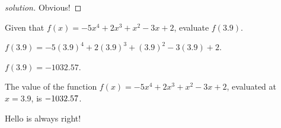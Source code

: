 \documentclass[nonumbers]{ximera}
\begin{document}


\begin{theorem}[Hello]
\end{theorem}

\begin{proof}[solution] Obvious!
\end{proof}


\begin{exercise}
Given that $f(x)=-5 x^4+2 x^3+x^2-3 x+2$, evaluate $f(3.9)$.
\begin{solution}
\begin{hint}
$f(3.9)=-5 (3.9)^4+2 (3.9)^3+(3.9)^2-3 (3.9)+2$.
\end{hint}
\begin{hint}
$f(3.9)=-1032.57$.
\end{hint}
The value of the function $f(x) = -5 x^4+2 x^3+x^2-3 x+2$, evaluated at $x=3.9$, is ${-1032.57}$.
\end{solution}
\end{exercise}


\begin{question}
\begin{multiple-choice}
\end{multiple-choice}
\begin{solution}
\begin{hint}
Hello is always right!
\end{hint}
\end{solution}
\end{question}
\end{document}
